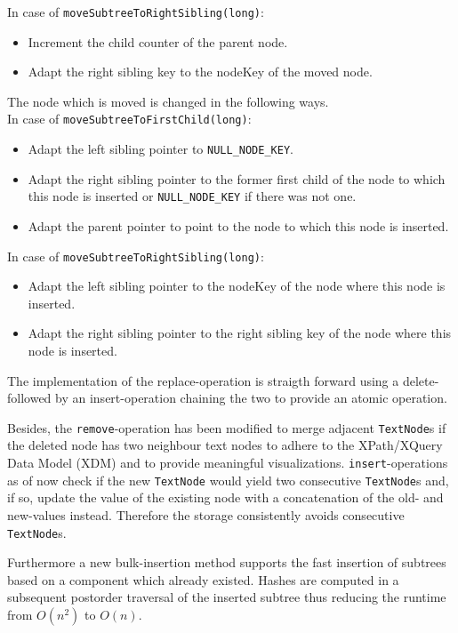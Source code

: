 In case of \texttt{moveSubtreeToRightSibling(long)}:
\begin{itemize}
\item Increment the child counter of the parent node.
\item Adapt the right sibling key to the nodeKey of the moved node.
\end{itemize}

The node which is moved is changed in the following ways. \\In case of \texttt{moveSubtreeToFirstChild(long)}:
\begin{itemize}
\item Adapt the left sibling pointer to \texttt{NULL\_NODE\_KEY}.
\item Adapt the right sibling pointer to the former first child of the node to which this node is inserted or \texttt{NULL\_NODE\_KEY} if there was not one.
\item Adapt the parent pointer to point to the node to which this node is inserted.
\end{itemize}

In case of \texttt{moveSubtreeToRightSibling(long)}:
\begin{itemize}
\item Adapt the left sibling pointer to the nodeKey of the node where this node is inserted.
\item Adapt the right sibling pointer to the right sibling key of the node where this node is inserted.
\end{itemize}

The implementation of the replace-operation is straigth forward using a delete- followed by an insert-operation chaining the two to provide an atomic operation.

Besides, the \texttt{remove}-operation has been modified to merge adjacent \texttt{TextNode}s if the deleted node has two neighbour text nodes to adhere to the XPath/XQuery Data Model (XDM) and to provide meaningful visualizations. \texttt{insert}-operations as of now check if the new \texttt{TextNode} would yield two consecutive \texttt{TextNode}s and, if so, update the value of the existing node with a concatenation of the old- and new-values instead. Therefore the storage consistently avoids consecutive \texttt{TextNode}s. 

Furthermore a new bulk-insertion method supports the fast insertion of subtrees based on a component which already existed. Hashes are computed in a subsequent postorder traversal of the inserted subtree thus reducing the runtime from $O(n^2)$ to $O(n)$.

